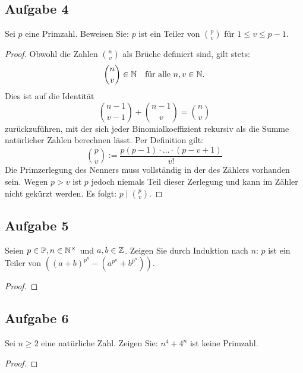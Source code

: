 \subsection{Aufgabe 4}
Sei $p$ eine Primzahl. Beweisen Sie: $p$ ist ein Teiler von $\binom{p}{v}$
für $1 \leq v \leq p - 1$.
\begin{proof}
Obwohl die Zahlen $\binom{n}{v}$ als Brüche definiert sind, gilt stets:
\begin{equation*}
\binom{n}{v} \in \mathbb{N} \quad \text{für alle } n,v \in \mathbb{N}.
\end{equation*}
Dies ist auf die Identität
\begin{equation*}
\binom{n - 1}{v - 1} + \binom{n - 1}{v} = \binom{n}{v}
\end{equation*}
zurückzuführen, mit der sich jeder Binomialkoeffizient rekursiv als
die Summe natürlicher Zahlen berechnen lässt.
Per Definition gilt:
\begin{equation*}
\binom{p}{v} := \frac{p(p-1) \cdot \ldots \cdot (p - v + 1)}{v!}
\end{equation*}
Die Primzerlegung des Nenners muss vollständig in der des Zählers vorhanden
sein. Wegen $p > v$ ist $p$ jedoch niemals Teil dieser Zerlegung und
kann im Zähler nicht gekürzt werden.
Es folgt: $p \mid \binom{p}{v}$.
\end{proof}

\subsection{Aufgabe 5}
Seien $p \in \mathbb{P}{}, n \in \mathbb{N}^\times{}$ und $a,b \in \mathbb{Z}{}$. Zeigen Sie durch Induktion
nach $n$: $p$ ist ein Teiler von
$((a + b)^{p^n} - (a^{p^n} + b^{p^n}))$.
\begin{proof}
  
\end{proof}

\subsection{Aufgabe 6}
Sei $n \geq 2$ eine natürliche Zahl. Zeigen Sie: $n^4 + 4^n$ ist keine Primzahl.
\begin{proof}
  
\end{proof}